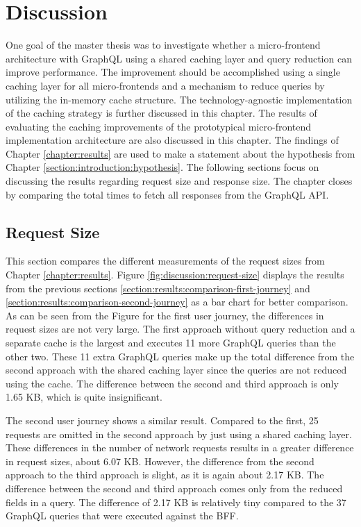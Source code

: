 \chapter{Discussion}\label{chapter:discussion}

One goal of the master thesis was to investigate whether a micro-frontend architecture with GraphQL using a shared caching layer and query reduction can improve performance. The improvement should be accomplished using a single caching layer for all micro-frontends and a mechanism to reduce queries by utilizing the in-memory cache structure. The technology-agnostic implementation of the caching strategy is further discussed in this chapter. The results of evaluating the caching improvements of the prototypical micro-frontend implementation architecture are also discussed in this chapter. The findings of Chapter \ref{chapter:results} are used to make a statement about the hypothesis from Chapter \ref{section:introduction:hypothesis}. The following sections focus on discussing the results regarding request size and response size. The chapter closes by comparing the total times to fetch all responses from the GraphQL \ac{API}.

\section{Request Size}\label{section:discussion:request-size}

This section compares the different measurements of the request sizes from Chapter \ref{chapter:results}. Figure \ref{fig:discussion:request-size} displays the results from the previous sections \ref{section:results:comparison-first-journey} and \ref{section:results:comparison-second-journey} as a bar chart for better comparison. As can be seen from the Figure for the first user journey, the differences in request sizes are not very large. The first approach without query reduction and a separate cache is the largest and executes 11 more GraphQL queries than the other two. These 11 extra GraphQL queries make up the total difference from the second approach with the shared caching layer since the queries are not reduced using the cache. The difference between the second and third approach is only 1.65 KB, which is quite insignificant.

\bigskip

\noindent The second user journey shows a similar result. Compared to the first, 25 requests are omitted in the second approach by just using a shared caching layer. These differences in the number of network requests results in a greater difference in request sizes, about 6.07 KB. However, the difference from the second approach to the third approach is slight, as it is again about 2.17 KB. The difference between the second and third approach comes only from the reduced fields in a query. The difference of 2.17 KB is relatively tiny compared to the 37 GraphQL queries that were executed against the \ac{BFF}.

